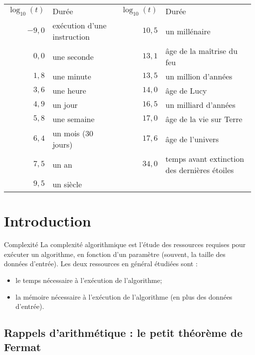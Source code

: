 \begin{center}
  \begin{tabular}{rl rl}
  $\log_{10}(t)$ & Durée &   $\log_{10}(t)$ & Durée \\
  $-9,0$ & exécution d'une instruction &  $10,5$ & un millénaire\\
  $0,0$ & une seconde &  $13,1$ & âge de la maîtrise du feu\\
  $1,8$ & une minute &  $13,5$ & un million d'années\\
  $3,6$ & une heure &  $14,0$ & âge de Lucy\\
  $4,9$ & un jour &  $16,5$ & un milliard d'années\\
  $5,8$ & une semaine&  $17,0$ & âge de la vie sur Terre\\
  $6,4$ & un mois (30 jours)&  $17,6$ & âge de l'univers\\
  $7,5$ & un an &  $34,0$ & temps avant extinction des dernières étoiles\\
  $9,5$ & un siècle\\
\end{tabular}
\end{center}


\section{Introduction}

\begin{defi}{Complexité}
  La complexité algorithmique est l'étude des ressources requises pour exécuter un algorithme, en fonction d'un paramètre (souvent, la taille des données d'entrée). Les deux ressources en général étudiées sont :
\begin{itemize}
\item le temps nécessaire à l'exécution de l'algorithme;
\item la mémoire nécessaire à l'exécution de l'algorithme (en plus des données d'entrée).
\end{itemize}
\end{defi}


%

\subsection{Rappels d'arithmétique : le petit théorème de Fermat}

